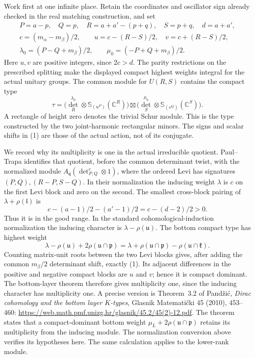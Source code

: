 Work first at one infinite place. Retain the coordinates
and oscillator sign already checked in the real matching
construction, and set
\[
 \begin{gathered}
 P=a-p,\quad Q=p,\quad
 R=a+a'-(p+q),\quad S=p+q,\quad d=a+a',\\
 c=(m_\alpha-m_\beta)/2,\qquad
 u=c-(R-S)/2,\quad v=c+(R-S)/2,\\
 \lambda_0=(P-Q+m_\beta)/2,\qquad
 \mu_0=(-P+Q+m_\beta)/2 .
 \end{gathered}
\]
Here \(u,v\) are positive integers, since \(2c>d\).
The parity restrictions on the prescribed splitting make
the displayed compact highest weights integral for the
actual unitary groups. The common module for \(U(R,S)\)
contains the compact type
\[
 \tau=
 \bigl(\det_R^{\lambda_0}\otimes
                    {\mathbb S}_{(u^P)}(\mathbb C^R)\bigr)
 \boxtimes
 \bigl(\det_S^{\mu_0}\otimes
                    {\mathbb S}_{(v^Q)}(\mathbb C^S)\bigr).
\tag{1}\label{eq:sr-real-branching-type}
\]
A rectangle of height zero denotes the trivial Schur module.
This is the type constructed by the two joint-harmonic
rectangular minors. The signs and scalar shifts in (1)
are those of the actual action, not of its conjugate.

We record why its multiplicity is one in the actual
irreducible quotient. Paul--Trapa identifies that quotient,
before the common determinant twist, with the normalized
module \(A_{\mathfrak q}(\det_{P,Q}^{c}\otimes1)\), where
the ordered Levi has signatures
\((P,Q),(R-P,S-Q)\). In their normalization the inducing
weight \(\lambda\) is \(c\) on the first Levi block and
zero on the second. The smallest cross-block pairing of
\(\lambda+\rho(\mathfrak l)\) is
\[
              c-(a-1)/2-(a'-1)/2
                      =c-(d-2)/2>0.
\]
Thus it is in the good range. In the standard
cohomological-induction normalization the inducing
character is \(\lambda-\rho(\mathfrak u)\). The bottom
compact type has highest weight
\[
       \lambda-\rho(\mathfrak u)
                         +2\rho(\mathfrak u\cap\mathfrak p)
       =\lambda+\rho(\mathfrak u\cap\mathfrak p)
                            -\rho(\mathfrak u\cap\mathfrak k).
\]
Counting matrix-unit roots between the two Levi blocks
gives, after adding the common \(m_\beta/2\) determinant
shift, exactly (1). Its adjacent differences in the
positive and negative compact blocks are \(u\) and \(v\);
hence it is compact dominant. The bottom-layer theorem
therefore gives multiplicity one, since the inducing
character has multiplicity one. A precise version is
Theorem~3.2 of Pand\v zi\'c,
\emph{Dirac cohomology and the bottom layer \(K\)-types},
Glasnik Matemati\v cki 45 (2010), 453--460:
\url{https://web.math.pmf.unizg.hr/glasnik/45.2/45(2)-12.pdf}.
The theorem states that a compact-dominant bottom weight
\(\mu_L+2\rho(\mathfrak u\cap\mathfrak p)\) retains its
multiplicity from the inducing module. The normalization
conversion above verifies its hypotheses here.
The same calculation applies to the lower-rank module.


